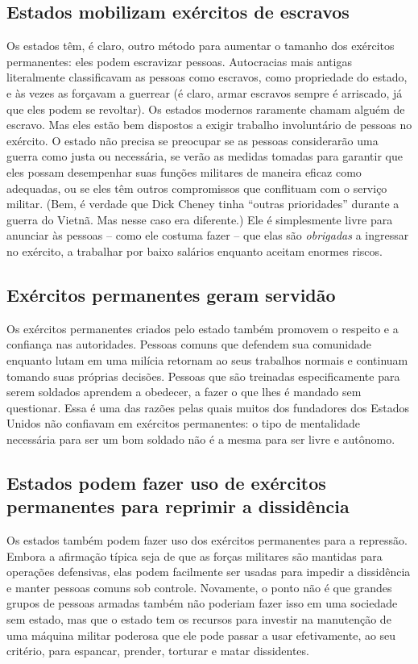 \subsection*{Estados mobilizam exércitos de escravos}

Os estados têm, é claro, outro método para aumentar o tamanho dos exércitos permanentes: eles podem escravizar pessoas. Autocracias mais antigas literalmente classificavam as pessoas como escravos, como propriedade do estado, e às vezes as forçavam a guerrear (é claro, armar escravos sempre é arriscado, já que eles podem se revoltar). Os estados modernos raramente chamam alguém de escravo. Mas eles estão bem dispostos a exigir trabalho involuntário de pessoas no exército. O estado não precisa se preocupar se as pessoas considerarão uma guerra como justa ou necessária, se verão as medidas tomadas para garantir que eles possam desempenhar suas funções militares de maneira eficaz como adequadas, ou se eles têm outros compromissos que conflituam com o serviço militar. (Bem, é verdade que Dick Cheney tinha ``outras prioridades'' durante a guerra do Vietnã. Mas nesse caso era diferente.) Ele é simplesmente livre para anunciar às pessoas -- como ele costuma fazer -- que elas são \emph{obrigadas} a ingressar no exército, a trabalhar por baixo salários enquanto aceitam enormes riscos.

\subsection*{Exércitos permanentes geram servidão}

Os exércitos permanentes criados pelo estado também promovem o respeito e a confiança nas autoridades. Pessoas comuns que defendem sua comunidade enquanto lutam em uma milícia retornam ao seus trabalhos normais e continuam tomando suas próprias decisões. Pessoas que são treinadas especificamente para serem soldados aprendem a obedecer, a fazer o que lhes é mandado sem questionar. Essa é uma das razões pelas quais muitos dos fundadores dos Estados Unidos não confiavam em exércitos permanentes: o tipo de mentalidade necessária para ser um bom soldado não é a mesma para ser livre e autônomo.

\subsection*{Estados podem fazer uso de exércitos permanentes para reprimir a dissidência}

Os estados também podem fazer uso dos exércitos permanentes para a repressão. Embora a afirmação típica seja de que as forças militares são mantidas para operações defensivas, elas podem facilmente ser usadas para impedir a dissidência e manter pessoas comuns sob controle. Novamente, o ponto não é que grandes grupos de pessoas armadas também não poderiam fazer isso em uma sociedade sem estado, mas que o estado tem os recursos para investir na manutenção de uma máquina militar poderosa que ele pode passar a usar efetivamente, ao seu critério, para espancar, prender, torturar e matar dissidentes.

